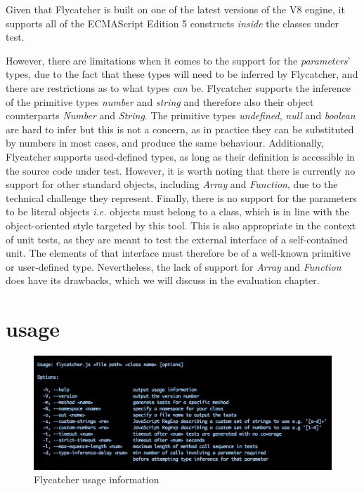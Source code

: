 Given that \textsf{Flycatcher} is built on one of the latest versions of the V8 engine, it supports all of the ECMAScript Edition 5 constructs \emph{inside} the classes under test.

However, there are limitations when it comes to the support for the \emph{parameters}' types, due to the fact that these types will need to be inferred by \textsf{Flycatcher}, and there are restrictions as to what types \emph{can} be. Flycatcher supports the inference of the primitive types \emph{number} and \emph{string} and therefore also their object counterparts \textit{Number} and \textit{String}. The primitive types \emph{undefined}, \emph{null} and \emph{boolean} are hard to infer but this is not a concern, as in practice they can be substituted by numbers in most cases, and produce the same behaviour. Additionally, \textsf{Flycatcher} supports used-defined types, as long as their definition is accessible in the source code under test. However, it is worth noting that there is currently no support for other standard objects, including \textit{Array} and \textit{Function}, due to the technical challenge they represent. Finally, there is no support for the parameters to be literal objects \emph{i.e.} objects must belong to a class, which is in line with the object-oriented style targeted by this tool. This is also appropriate in the context of unit tests, as they are meant to test the external interface of a self-contained unit. The elements of that interface must therefore be of a well-known primitive or user-defined type. Nevertheless, the lack of support for \textit{Array} and \textit{Function} does have its drawbacks, which we will discuss in the evaluation chapter.

\section{\textsf{} usage}
\label{usagesection}
\begin{figure}[h]
\hspace*{-.9cm}
\centering
\includegraphics[scale=0.45]{./components/chapter3/usage.png}
\caption{\textsf{Flycatcher} usage information}
\label{usage}
\end{figure}

